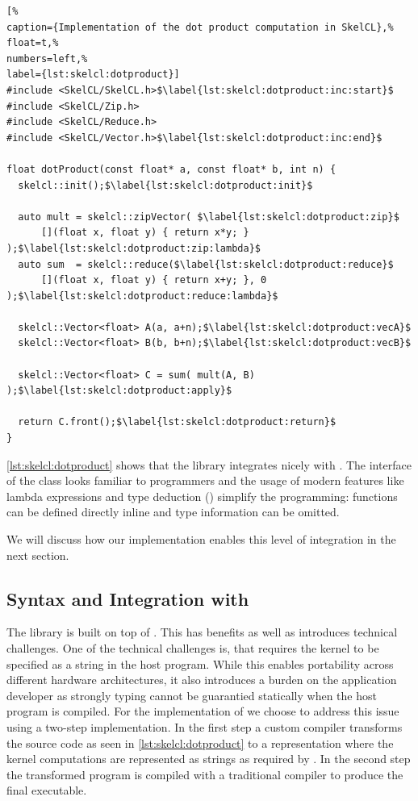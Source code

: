 \begin{lstlisting}[%                                                             
caption={Implementation of the dot product computation in SkelCL},%
float=t,%
numbers=left,%
label={lst:skelcl:dotproduct}]
#include <SkelCL/SkelCL.h>$\label{lst:skelcl:dotproduct:inc:start}$
#include <SkelCL/Zip.h>
#include <SkelCL/Reduce.h>
#include <SkelCL/Vector.h>$\label{lst:skelcl:dotproduct:inc:end}$

float dotProduct(const float* a, const float* b, int n) {
  skelcl::init();$\label{lst:skelcl:dotproduct:init}$

  auto mult = skelcl::zipVector( $\label{lst:skelcl:dotproduct:zip}$
      [](float x, float y) { return x*y; } );$\label{lst:skelcl:dotproduct:zip:lambda}$
  auto sum  = skelcl::reduce($\label{lst:skelcl:dotproduct:reduce}$
      [](float x, float y) { return x+y; }, 0 );$\label{lst:skelcl:dotproduct:reduce:lambda}$

  skelcl::Vector<float> A(a, a+n);$\label{lst:skelcl:dotproduct:vecA}$
  skelcl::Vector<float> B(b, b+n);$\label{lst:skelcl:dotproduct:vecB}$

  skelcl::Vector<float> C = sum( mult(A, B) );$\label{lst:skelcl:dotproduct:apply}$

  return C.front();$\label{lst:skelcl:dotproduct:return}$
}
\end{lstlisting}

\autoref{lst:skelcl:dotproduct} shows that the \SkelCL library integrates nicely with \Cpp.
The interface of the  class looks familiar to \Cpp programmers and the usage of modern \Cpp features like lambda expressions and type deduction () simplify the programming:
functions can be defined directly inline and type information can be omitted.

We will discuss how our implementation enables this level of integration in the next section.










\subsection{Syntax and Integration with \Cpp}
\label{section:skelcl-library:syntax}

The \SkelCL library is built on top of \OpenCL.
This has benefits as well as introduces technical challenges.
One of the technical challenges is, that \OpenCL requires the kernel to be specified as a string in the host program.
While this enables portability across different hardware architectures, it also introduces a burden on the application developer as strongly typing cannot be guarantied statically when the host program is compiled.
For the implementation of \SkelCL we choose to address this issue using a two-step implementation.
In the first step a custom compiler transforms the source code as seen in \autoref{lst:skelcl:dotproduct} to a representation where the kernel computations are represented as strings as required by \OpenCL.
In the second step the transformed program is compiled with a traditional \Cpp compiler to produce the final executable.

